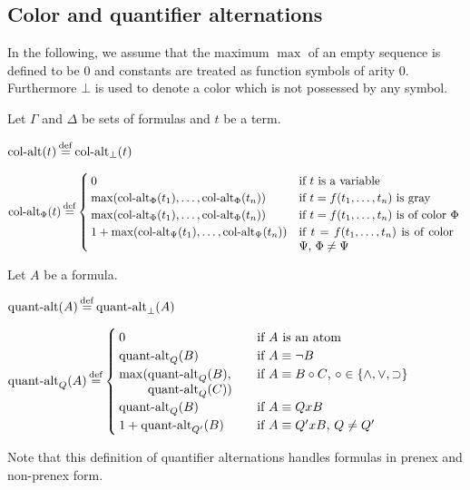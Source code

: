 \documentclass[%
	draft=false,%
	numbers=noendperiod,%
	11pt,%
	a4paper,%
	oneside,%
	openany,%
]{memoir}
\begin{document}
\subsection{Color and quantifier alternations}

In the following, we assume that the maximum $\max$ of an empty sequence is defined to be $0$ and constants are treated as function symbols of arity $0$.
Furthermore $\bot$ is used to denote a color which is not possessed by any symbol.
\begin{defi}
	Let $\Gamma$ and $\Delta$ be sets of formulas and $t$ be a term.

	\medskip

	\noindent
	$\ca(t) \defeq \ca_\bot(t)$
	\medskip

	\begin{adjustwidth}{-1.7em}{}
	\noindent
	$
	\ca_\Phi(t) \defeq 
	\begin{cases}
		0 & \text{if $t$ is a variable} \\
		\max(\ca_\Phi(t_1), \dots, \ca_\Phi(t_n)) & \text{if $t = f(t_1, \dots, t_n)$ is gray} \\
		\max(\ca_\Phi(t_1), \dots, \ca_\Phi(t_n)) & \parbox[t]{0.4\textwidth}{if $t = f(t_1, \dots, t_n)$ is of color $\Phi$} \\
		1 + \max(\ca_\Psi(t_1), \dots, \ca_\Psi(t_n)) & \parbox[t]{0.38\textwidth}{if $t = f(t_1, \dots, t_n)$ is of color $\Psi$, $\Phi \neq \Psi$} \\
	\end{cases}
	$
\end{adjustwidth}
\end{defi}


\begin{defi}
	Let $A$ be a formula.\nopagebreak
	\medskip

	\noindent
	$\qa(A) \defeq \qa_\bot(A)$
	\nopagebreak
	\medskip

	\noindent
	$
	\qa_Q(A) \defeq 
	\begin{cases}
		0 & \text{if $A$ is an atom} \\
		\qa_Q(B) & \text{if $A \equiv \lnot B$} \\
		\max(\parbox[t]{0.22\textwidth}{$\qa_Q(B),$\newline$ \qa_Q(C))$} & \text{if $A \equiv B \circ C$, $\circ \in \{\land, \lor, \limpl\}$} \\
		\qa_Q(B) & \text{if $A \equiv Q x B$} \\
		1+\qa_{Q'}(B) & \text{if $A \equiv Q' x B$, $Q \neq Q'$}  \\
	\end{cases}
	$
	\nopagebreak

	\qedhere
\end{defi}
Note that this definition of quantifier alternations handles formulas in prenex and non-prenex form.
\end{document}
